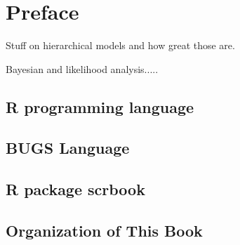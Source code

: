 \chapter{
Preface
}
\label{chapt.preface}


Stuff on hierarchical models and how great those are.

Bayesian and likelihood analysis.....

\section{R programming language}




\section{BUGS Language}




\section{R package scrbook}


\section{Organization of This Book}

